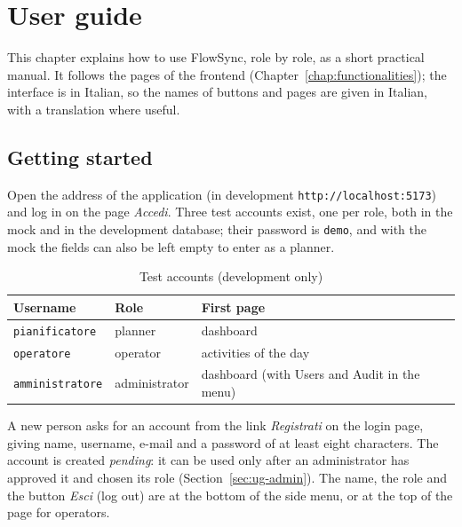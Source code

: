 \chapter{User guide}
\label{chap:user-guide}

This chapter explains how to use FlowSync, role by role, as a short practical manual. It follows
the pages of the frontend (Chapter~\ref{chap:functionalities}); the interface is in Italian, so
the names of buttons and pages are given in Italian, with a translation where useful.


\section{Getting started}
\label{sec:ug-start}

Open the address of the application (in development \texttt{http://localhost:5173}) and log in
on the page \emph{Accedi}. Three test accounts exist, one per role, both in the mock and in the
development database; their password is \texttt{demo}, and with the mock the fields can also be
left empty to enter as a planner.

\begin{table}[htpb]
  \centering
  \small
  \begin{tabular}{@{}lll@{}}
    \toprule
    \textbf{Username} & \textbf{Role} & \textbf{First page} \\
    \midrule
    \texttt{pianificatore} & planner & dashboard \\
    \texttt{operatore} & operator & activities of the day \\
    \texttt{amministratore} & administrator & dashboard (with Users and Audit in the menu) \\
    \bottomrule
  \end{tabular}
  \caption{Test accounts (development only)}
  \label{tab:test-accounts}
\end{table}

A new person asks for an account from the link \emph{Registrati} on the login page, giving name,
username, e-mail and a password of at least eight characters. The account is created
\emph{pending}: it can be used only after an administrator has approved it and chosen its role
(Section~\ref{sec:ug-admin}). The name, the role and the button \emph{Esci} (log out) are at the
bottom of the side menu, or at the top of the page for operators.

